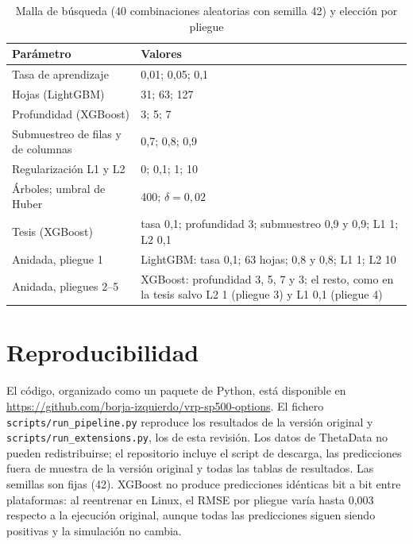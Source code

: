 \documentclass[11pt,a4paper]{article}
\newcommand{\repourl}{\url{https://github.com/borja-izquierdo/vrp-sp500-options}}
\begin{document}
\begin{table}[!htbp]
\centering
\caption{Malla de búsqueda (40 combinaciones aleatorias con semilla 42) y elección por pliegue}\label{tab:hiper}
\small
\begin{tabularx}{\linewidth}{@{}lX@{}}
\toprule
Parámetro & Valores \\
\midrule
Tasa de aprendizaje & 0,01; 0,05; 0,1 \\
Hojas (LightGBM) & 31; 63; 127 \\
Profundidad (XGBoost) & 3; 5; 7 \\
Submuestreo de filas y de columnas & 0,7; 0,8; 0,9 \\
Regularización L1 y L2 & 0; 0,1; 1; 10 \\
Árboles; umbral de Huber & 400; $\delta=0{,}02$ \\
\midrule
Tesis (XGBoost) & tasa 0,1; profundidad 3; submuestreo 0,9 y 0,9; L1 1; L2 0,1 \\
Anidada, pliegue 1 & LightGBM: tasa 0,1; 63 hojas; 0,8 y 0,8; L1 1; L2 10 \\
Anidada, pliegues 2--5 & XGBoost: profundidad 3, 5, 7 y 3; el resto, como en la tesis salvo L2 1 (pliegue 3) y L1 0,1 (pliegue 4) \\
\bottomrule
\end{tabularx}
\end{table}

\section{Reproducibilidad}

El código, organizado como un paquete de Python, está disponible en \repourl. El fichero \texttt{scripts/run\_pipeline.py} reproduce los resultados de la versión original y \texttt{scripts/run\_extensions.py}, los de esta revisión. Los datos de ThetaData no pueden redistribuirse; el repositorio incluye el script de descarga, las predicciones fuera de muestra de la versión original y todas las tablas de resultados. Las semillas son fijas (42). XGBoost no produce predicciones idénticas bit a bit entre plataformas: al reentrenar en Linux, el RMSE por pliegue varía hasta 0,003 respecto a la ejecución original, aunque todas las predicciones siguen siendo positivas y la simulación no cambia.
\end{document}
